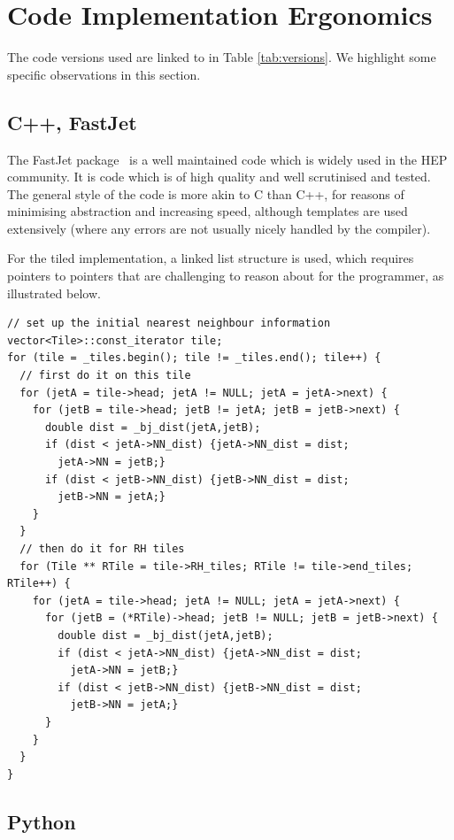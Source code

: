 \documentclass{webofc}
\begin{document}
\section{Code Implementation Ergonomics}
\label{sec:ergonomics}

The code versions used are linked to in Table \ref{tab:versions}. We highlight
some specific observations in this section.

\subsection{C++, FastJet}
\label{sec:cpp-ergonomics}

The FastJet package~\cite{Cacciari:2011ma,fastjet-web} is a well maintained code
which is widely used in the HEP community. It is code which is of high quality
and well scrutinised and tested. The general style of the code is more akin to C
than C++, for reasons of minimising abstraction and increasing speed, although
templates are used extensively (where any errors are not usually nicely handled
by the compiler).

For the tiled implementation, a linked list structure is used, which requires
pointers to pointers that are challenging to reason about for the programmer, as
illustrated below.

\begin{verbatim}
// set up the initial nearest neighbour information
vector<Tile>::const_iterator tile;
for (tile = _tiles.begin(); tile != _tiles.end(); tile++) {
  // first do it on this tile
  for (jetA = tile->head; jetA != NULL; jetA = jetA->next) {
    for (jetB = tile->head; jetB != jetA; jetB = jetB->next) {
      double dist = _bj_dist(jetA,jetB);
      if (dist < jetA->NN_dist) {jetA->NN_dist = dist; 
        jetA->NN = jetB;}
      if (dist < jetB->NN_dist) {jetB->NN_dist = dist; 
        jetB->NN = jetA;}
    }
  }
  // then do it for RH tiles
  for (Tile ** RTile = tile->RH_tiles; RTile != tile->end_tiles; RTile++) {
    for (jetA = tile->head; jetA != NULL; jetA = jetA->next) {
      for (jetB = (*RTile)->head; jetB != NULL; jetB = jetB->next) {
        double dist = _bj_dist(jetA,jetB);
        if (dist < jetA->NN_dist) {jetA->NN_dist = dist; 
          jetA->NN = jetB;}
        if (dist < jetB->NN_dist) {jetB->NN_dist = dist; 
          jetB->NN = jetA;}
      }
    }
  }
}
\end{verbatim}

\subsection{Python}
\label{sec:python-ergonomics}
\end{document}
